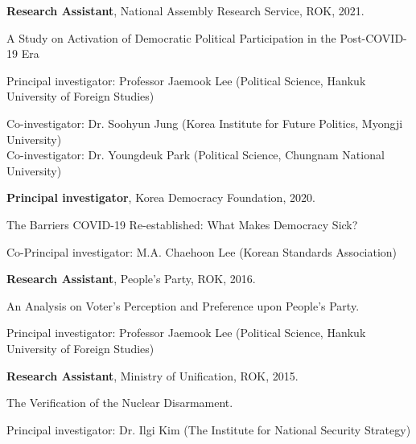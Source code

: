 \documentclass[margin,line]{res}
\begin{document}
\begin{resume}
\vspace{-.1cm}
{\bf Research Assistant}, National Assembly Research Service, ROK, 2021.

\vspace{-.43cm}

A Study on Activation of Democratic Political Participation in the Post-COVID-19 Era

\vspace{-.43cm}

Principal investigator: Professor Jaemook Lee \small{(Political Science, Hankuk University of Foreign Studies)}

\vspace{-.43cm}

Co-investigator: Dr. Soohyun Jung \small{(Korea Institute for Future Politics, Myongji University)}\\
Co-investigator: Dr. Youngdeuk Park \small{(Political Science, Chungnam National University)}

\vspace{-.1cm}

{\bf Principal investigator}, Korea Democracy Foundation, 2020.

\vspace{-.43cm}

The Barriers COVID-19 Re-established: What Makes Democracy Sick?

\vspace{-.43cm}
Co-Principal investigator: M.A. Chaehoon Lee \small{(Korean Standards Association)}

\vspace{-.1cm}
{\bf Research Assistant}, People's Party, ROK, 2016.

\vspace{-.43cm}

An Analysis on Voter’s Perception and Preference upon People’s Party.

\vspace{-.43cm}

Principal investigator: Professor Jaemook Lee \small{(Political Science, Hankuk University of Foreign Studies)}

\vspace{-.1cm}
{\bf Research Assistant}, Ministry of Unification, ROK, 2015.

\vspace{-.43cm}

The Verification of the Nuclear Disarmament.

\vspace{-.43cm}
Principal investigator: Dr. Ilgi Kim \small{(The Institute for National Security Strategy)}


\end{resume}
\end{document}
